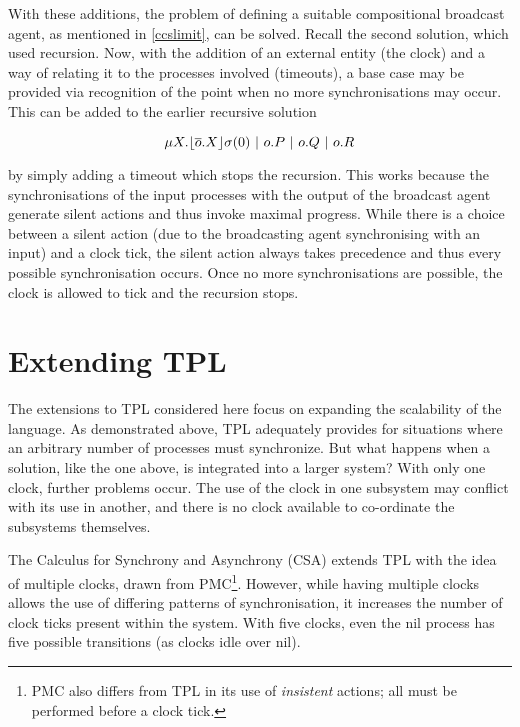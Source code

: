 With these additions, the problem of defining a suitable compositional
broadcast agent, as mentioned in \ref{ccslimit}, can be solved.
Recall the second solution, which used recursion.  Now, with the
addition of an external entity (the clock) and a way of relating it to
the processes involved (timeouts), a base case may be provided via
recognition of the point when no more synchronisations may occur.
This can be added to the earlier recursive solution

\begin{equation}
\mu X.\timeout{\overline{o}.X}{\sigma}{0}\ |\ o.P\ |\ o.Q\ |\ o.R
\end{equation}

\noindent by simply adding a timeout which stops the recursion.  This
works because the synchronisations of the input processes with the
output of the broadcast agent generate silent actions and thus invoke
maximal progress.  While there is a choice between a silent action
(due to the broadcasting agent synchronising with an input) and a
clock tick, the silent action always takes precedence and thus every
possible synchronisation occurs.  Once no more synchronisations are
possible, the clock is allowed to tick and the recursion stops.

\section{Extending TPL}
\label{tplext}

The extensions to TPL considered here focus on expanding the
scalability of the language.  As demonstrated above, TPL adequately
provides for situations where an arbitrary number of processes must
synchronize.  But what happens when a solution, like the one above, is
integrated into a larger system?  With only one clock, further
problems occur.  The use of the clock in one subsystem may conflict
with its use in another, and there is no clock available to
co-ordinate the subsystems themselves.

The Calculus for Synchrony and Asynchrony (CSA) \cite{csa} extends TPL
with the idea of multiple clocks, drawn from PMC\footnote{PMC also
  differs from TPL in its use of \emph{insistent} actions; all must be
  performed before a clock tick.}\cite{pmc}. However, while having
multiple clocks allows the use of differing patterns of
synchronisation, it increases the number of clock ticks present within
the system.  With five clocks, even the nil process has five possible
transitions (as clocks idle over nil).

